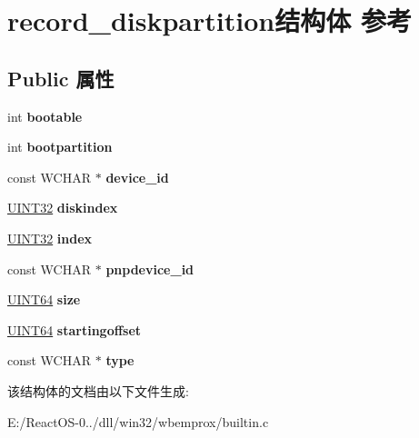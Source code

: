 \hypertarget{structrecord__diskpartition}{}\section{record\+\_\+diskpartition结构体 参考}
\label{structrecord__diskpartition}
\subsection*{Public 属性}
\begin{DoxyCompactItemize}
\item 
\mbox{\label{structrecord__diskpartition_a7fac8baaa8dafaddb74a5386c89f3273}} 
int {\bfseries bootable}
\item 
\mbox{\label{structrecord__diskpartition_a31cf467d27d3d87273eeae8953cc4f22}} 
int {\bfseries bootpartition}
\item 
\mbox{\label{structrecord__diskpartition_acadb95bbc9fa7a5544503736b00f74d5}} 
const W\+C\+H\+AR $\ast$ {\bfseries device\+\_\+id}
\item 
\mbox{\label{structrecord__diskpartition_abf057a46189bac601c9b8b5fbd0b132c}} 
\hyperlink{_processor_bind_8h_ae1e6edbbc26d6fbc71a90190d0266018}{U\+I\+N\+T32} {\bfseries diskindex}
\item 
\mbox{\label{structrecord__diskpartition_aa9d35ff4fd1630cfc0b7563728e88ae4}} 
\hyperlink{_processor_bind_8h_ae1e6edbbc26d6fbc71a90190d0266018}{U\+I\+N\+T32} {\bfseries index}
\item 
\mbox{\label{structrecord__diskpartition_a82cd654e4639be12b30a4f8042d37524}} 
const W\+C\+H\+AR $\ast$ {\bfseries pnpdevice\+\_\+id}
\item 
\mbox{\label{structrecord__diskpartition_ada49f660df2b0cdb695fa8cf0efdfa33}} 
\hyperlink{_processor_bind_8h_a57be03562867144161c1bfee95ca8f7c}{U\+I\+N\+T64} {\bfseries size}
\item 
\mbox{\label{structrecord__diskpartition_add3a388c54b30245701c63b1f466f0da}} 
\hyperlink{_processor_bind_8h_a57be03562867144161c1bfee95ca8f7c}{U\+I\+N\+T64} {\bfseries startingoffset}
\item 
\mbox{\label{structrecord__diskpartition_af7930ca7f5c738235577cd0a2b8e3419}} 
const W\+C\+H\+AR $\ast$ {\bfseries type}
\end{DoxyCompactItemize}


该结构体的文档由以下文件生成\+:\begin{DoxyCompactItemize}
\item 
E\+:/\+React\+O\+S-\/0../dll/win32/wbemprox/builtin.\+c\end{DoxyCompactItemize}
